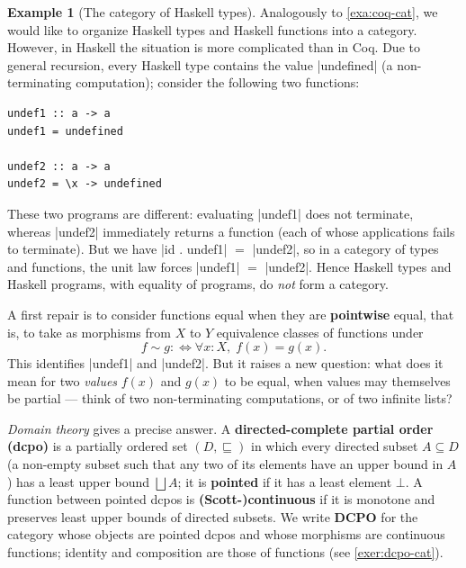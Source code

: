 \documentclass[a4paper,11pt, oneside,titlepage=false]{scrbook}
\theoremstyle{plain}
\theoremstyle{definition}
\newtheorem{exa}[thm]{Example}
\newcommand{\Catb}[1]{\mathbf{#1}}
\newcommand{\DCPO}{\Catb{DCPO}}
\begin{document}
\begin{exa}[The category of Haskell types]\label{example:hask}
  Analogously to \cref{exa:coq-cat}, we would like to organize Haskell types and
  Haskell functions into a category.
  However, in Haskell the situation is more complicated than in Coq.
  Due to general recursion, every Haskell type contains the value |undefined|
  (a non-terminating computation); consider the following two functions:
\begin{lstlisting}
undef1 :: a -> a
undef1 = undefined

undef2 :: a -> a
undef2 = \x -> undefined
\end{lstlisting}
  These two programs are different: evaluating |undef1| does not terminate,
  whereas |undef2| immediately returns a function (each of whose applications
  fails to terminate).
  But we have |id . undef1| $=$ |undef2|, so in a category of types and
  functions, the unit law forces |undef1| $=$ |undef2|.
  Hence Haskell types and Haskell programs, with equality of programs, do
  \emph{not} form a category.

  A first repair is to consider functions equal when they are \textbf{pointwise}
  equal, that is, to take as morphisms from $X$ to $Y$ equivalence classes of
  functions under
  \[ f \sim g :\iff \forall x : X,\; f(x) = g(x). \]
  This identifies |undef1| and |undef2|.
  But it raises a new question: what does it mean for two \emph{values} $f(x)$
  and $g(x)$ to be equal, when values may themselves be partial --- think of two
  non-terminating computations, or of two infinite lists?

  \emph{Domain theory} gives a precise answer.
  A \textbf{directed-complete partial order (dcpo)} is a partially ordered set
  $(D, \sqsubseteq)$ in which every directed subset $A \subseteq D$ (a non-empty
  subset such that any two of its elements have an upper bound in $A$) has a
  least upper bound $\bigsqcup A$; it is \textbf{pointed} if it has a least
  element $\bot$.
  A function between pointed dcpos is \textbf{(Scott-)continuous} if it is
  monotone and preserves least upper bounds of directed subsets.
  We write $\DCPO$ for the category whose objects are pointed dcpos and whose
  morphisms are continuous functions; identity and composition are those of
  functions (see \cref{exer:dcpo-cat}).


\end{exa}
\end{document}
